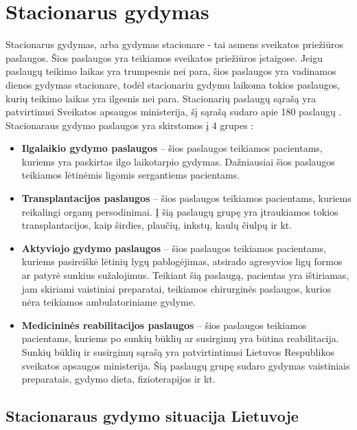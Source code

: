 \section{Stacionarus gydymas}

Stacionarus gydymas, arba gydymas stacionare - tai asmens sveikatos priežiūros paslaugos. Šios paslaugos yra teikiamos sveikatos priežiūros įstaigose. Jeigu paslaugų teikimo laikas yra trumpesnis nei para, šios paslaugos yra vadinamos dienos gydymas stacionare, todėl stacionariu gydymu laikoma tokios paslaugos, kurių teikimo laikas yra ilgesnis nei para. Stacionarių paslaugų sąrašą yra patvirtinusi Sveikatos apsaugos ministerija, šį sąrašą sudaro apie 180 paslaugų \cite{StacionaroPaslaugos}. Stacionaraus gydymo paslaugos yra skirstomos į 4 grupes \cite{LigoniuKasa}: 
\begin{itemize}
    \item \textbf{Ilgalaikio gydymo paslaugos} – šios paslaugos teikiamos pacientams, kuriems yra paskirtas ilgo laikotarpio gydymas. Dažniausiai šios paslaugos teikiamos lėtinėmis ligomis sergantiems pacientams.
    \item \textbf{Transplantacijos paslaugos} – šios paslaugos teikiamos pacientams, kuriems reikalingi organų persodinimai. Į šią paslaugų grupę yra įtraukiamos tokios transplantacijos, kaip širdies, plaučių, inkstų, kaulų čiulpų ir kt. 
    \item \textbf{Aktyviojo gydymo paslaugos} – šios paslaugos teikiamos pacientams, kuriems pasireiškė lėtinių lygų pablogėjimas, atsirado agresyvios ligų formos ar patyrė sunkius sužalojimus. Teikiant šią paslaugą, pacientas yra ištiriamas, jam skiriami vaistiniai preparatai, teikiamos chirurginės paslaugos, kurios nėra teikiamos ambulatoriniame gydyme.
    \item \textbf{Medicininės reabilitacijos paslaugos} – šios paslaugos teikiamos pacientams, kuriems po sunkių būklių ar susirgimų yra būtina reabilitacija. Sunkių būklių ir susirgimų sąrašą yra patvirtintinusi Lietuvos Respublikos sveikatos apsaugos ministerija. Šią paslaugų grupę sudaro gydymas vaistiniais preparatais, gydymo dieta, fizioterapijos ir kt.
\end{itemize}

\subsection{Stacionaraus gydymo situacija Lietuvoje}

